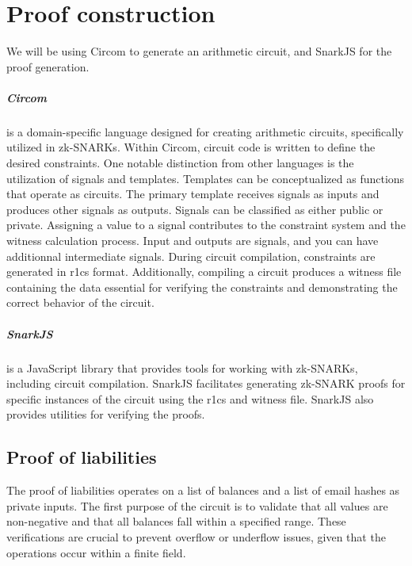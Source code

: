 
\chapter{Proof construction}
We will be using Circom to generate an arithmetic circuit, and SnarkJS for the proof generation.

\paragraph{Circom} is a domain-specific language designed for creating arithmetic circuits, specifically utilized in zk-SNARKs.
Within Circom, circuit code is written to define the desired constraints. One notable distinction from other languages is the utilization of signals and templates.
Templates can be conceptualized as functions that operate as circuits. The primary template receives signals as inputs and produces other signals as outputs. Signals can be classified as either public or private.
Assigning a value to a signal contributes to the constraint system and the witness calculation process.
Input and outputs are signals, and you can have additionnal intermediate signals.
During circuit compilation, constraints are generated in r1cs format. Additionally, compiling a circuit produces a witness file containing the data essential for verifying the constraints and demonstrating the correct behavior of the circuit.


\paragraph{SnarkJS} is a JavaScript library that provides tools for working with zk-SNARKs, including circuit compilation.
SnarkJS facilitates generating zk-SNARK proofs for specific instances of the circuit using the r1cs and witness file.
SnarkJS also provides utilities for verifying the proofs.


\section{Proof of liabilities}
\label{subsec:pl}
The proof of liabilities operates on a list of balances and a list of email hashes as private inputs.
The first purpose of the circuit is to validate that all values are non-negative and that all balances fall within a specified range.
These verifications are crucial to prevent overflow or underflow issues, given that the operations occur within a finite field.

